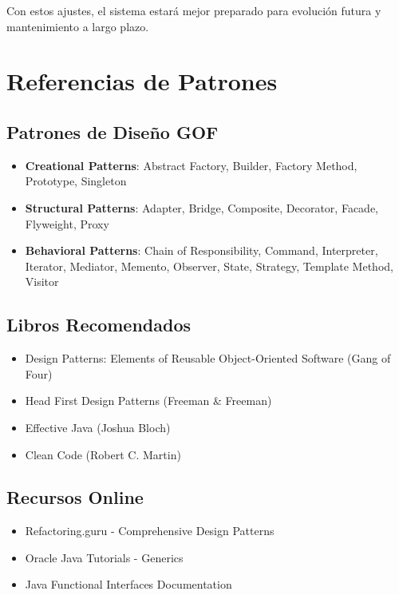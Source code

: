 \documentclass[12pt, a4paper]{report}
\begin{document}
Con estos ajustes, el sistema estará mejor preparado para evolución futura y mantenimiento a largo plazo.

\newpage

\appendix

\chapter{Referencias de Patrones}

\section{Patrones de Diseño GOF}

\begin{itemize}
    \item \textbf{Creational Patterns}: Abstract Factory, Builder, Factory Method, Prototype, Singleton
    \item \textbf{Structural Patterns}: Adapter, Bridge, Composite, Decorator, Facade, Flyweight, Proxy
    \item \textbf{Behavioral Patterns}: Chain of Responsibility, Command, Interpreter, Iterator, Mediator, Memento, Observer, State, Strategy, Template Method, Visitor
\end{itemize}

\section{Libros Recomendados}

\begin{itemize}
    \item Design Patterns: Elements of Reusable Object-Oriented Software (Gang of Four)
    \item Head First Design Patterns (Freeman \& Freeman)
    \item Effective Java (Joshua Bloch)
    \item Clean Code (Robert C. Martin)
\end{itemize}

\section{Recursos Online}

\begin{itemize}
    \item Refactoring.guru - Comprehensive Design Patterns
    \item Oracle Java Tutorials - Generics
    \item Java Functional Interfaces Documentation
\end{itemize}
\end{document}

